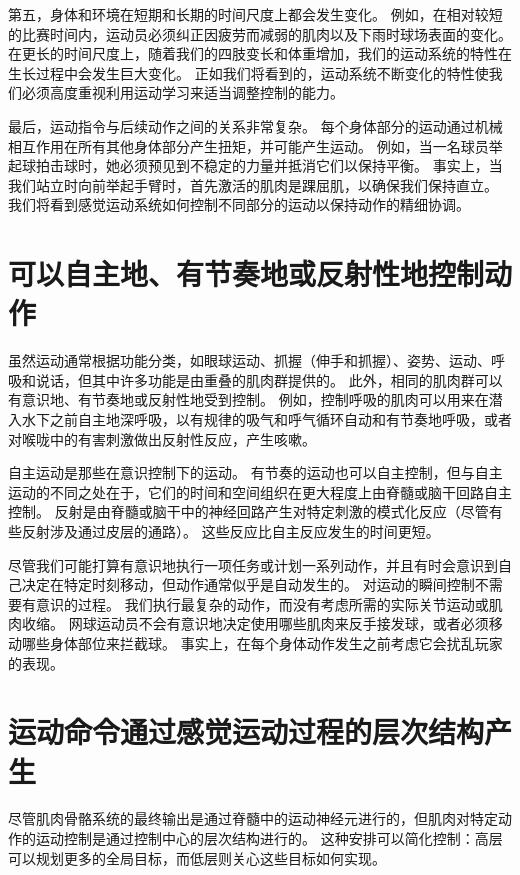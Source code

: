 第五，身体和环境在短期和长期的时间尺度上都会发生变化。
例如，在相对较短的比赛时间内，运动员必须纠正因疲劳而减弱的肌肉以及下雨时球场表面的变化。
在更长的时间尺度上，随着我们的四肢变长和体重增加，我们的运动系统的特性在生长过程中会发生巨大变化。
正如我们将看到的，运动系统不断变化的特性使我们必须高度重视利用运动学习来适当调整控制的能力。


最后，运动指令与后续动作之间的关系非常复杂。
每个身体部分的运动通过机械相互作用在所有其他身体部分产生扭矩，并可能产生运动。
例如，当一名球员举起球拍击球时，她必须预见到不稳定的力量并抵消它们以保持平衡。
事实上，当我们站立时向前举起手臂时，首先激活的肌肉是踝屈肌，以确保我们保持直立。
我们将看到感觉运动系统如何控制不同部分的运动以保持动作的精细协调。



\section{可以自主地、有节奏地或反射性地控制动作}

虽然运动通常根据功能分类，如眼球运动、抓握（伸手和抓握）、姿势、运动、呼吸和说话，但其中许多功能是由重叠的肌肉群提供的。
此外，相同的肌肉群可以有意识地、有节奏地或反射性地受到控制。
例如，控制呼吸的肌肉可以用来在潜入水下之前自主地深呼吸，以有规律的吸气和呼气循环自动和有节奏地呼吸，或者对喉咙中的有害刺激做出反射性反应，产生咳嗽。


自主运动是那些在意识控制下的运动。
有节奏的运动也可以自主控制，但与自主运动的不同之处在于，它们的时间和空间组织在更大程度上由脊髓或脑干回路自主控制。
反射是由脊髓或脑干中的神经回路产生对特定刺激的模式化反应（尽管有些反射涉及通过皮层的通路）。
这些反应比自主反应发生的时间更短。


尽管我们可能打算有意识地执行一项任务或计划一系列动作，并且有时会意识到自己决定在特定时刻移动，但动作通常似乎是自动发生的。
对运动的瞬间控制不需要有意识的过程。
我们执行最复杂的动作，而没有考虑所需的实际关节运动或肌肉收缩。
网球运动员不会有意识地决定使用哪些肌肉来反手接发球，或者必须移动哪些身体部位来拦截球。
事实上，在每个身体动作发生之前考虑它会扰乱玩家的表现。



\section{运动命令通过感觉运动过程的层次结构产生}

尽管肌肉骨骼系统的最终输出是通过脊髓中的运动神经元进行的，但肌肉对特定动作的运动控制是通过控制中心的层次结构进行的。
这种安排可以简化控制：高层可以规划更多的全局目标，而低层则关心这些目标如何实现。


